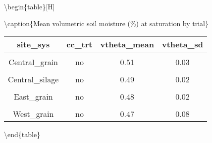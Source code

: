 \documentclass[
]{article}
\begin{document}
\textbackslash begin\{table\}{[}H{]}

\textbackslash caption\{\label{tab:sat}Mean volumetric soil moisture
(\%) at saturation by trial\} \centering

\begin{tabular}[t]{cccc}
\toprule
site\_sys & cc\_trt & vtheta\_mean & vtheta\_sd\\
\midrule
\cellcolor{gray!6}{Central\_grain} & \cellcolor{gray!6}{cc} & \cellcolor{gray!6}{0.48} & \cellcolor{gray!6}{0.02}\\
\cmidrule{1-4}
Central\_grain & no & 0.51 & 0.03\\
\cmidrule{1-4}
\cellcolor{gray!6}{Central\_silage} & \cellcolor{gray!6}{cc} & \cellcolor{gray!6}{0.49} & \cellcolor{gray!6}{0.03}\\
\cmidrule{1-4}
Central\_silage & no & 0.49 & 0.02\\
\cmidrule{1-4}
\cellcolor{gray!6}{East\_grain} & \cellcolor{gray!6}{cc} & \cellcolor{gray!6}{0.49} & \cellcolor{gray!6}{0.02}\\
\cmidrule{1-4}
East\_grain & no & 0.48 & 0.02\\
\cmidrule{1-4}
\cellcolor{gray!6}{West\_grain} & \cellcolor{gray!6}{cc} & \cellcolor{gray!6}{0.43} & \cellcolor{gray!6}{0.05}\\
\cmidrule{1-4}
West\_grain & no & 0.47 & 0.08\\
\bottomrule
\end{tabular}

\textbackslash end\{table\}
\end{document}
